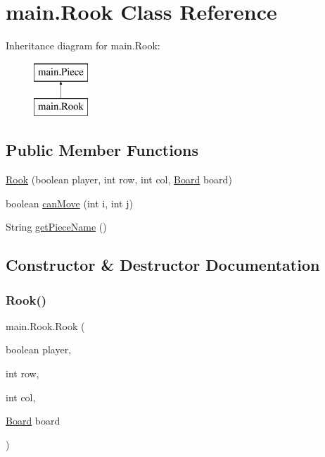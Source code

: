 \hypertarget{classmain_1_1_rook}{}\section{main.\+Rook Class Reference}
\label{classmain_1_1_rook}
Inheritance diagram for main.\+Rook\+:\begin{figure}[H]
\begin{center}
\leavevmode
\includegraphics[height=2.000000cm]{classmain_1_1_rook}
\end{center}
\end{figure}
\subsection*{Public Member Functions}
\begin{DoxyCompactItemize}
\item 
\mbox{\hyperlink{classmain_1_1_rook_af84d3dc19526041f7bb61f3544ab1b4c}{Rook}} (boolean player, int row, int col, \mbox{\hyperlink{classmain_1_1_board}{Board}} board)
\item 
boolean \mbox{\hyperlink{classmain_1_1_rook_a53e4097e83f1ee1d0a093b1dc7efcffa}{can\+Move}} (int i, int j)
\item 
String \mbox{\hyperlink{classmain_1_1_rook_a33eaf3b77f78846b7d165338d6e7bf52}{get\+Piece\+Name}} ()
\end{DoxyCompactItemize}


\subsection{Constructor \& Destructor Documentation}
\mbox{\label{classmain_1_1_rook_af84d3dc19526041f7bb61f3544ab1b4c}} 
\subsubsection{\texorpdfstring{Rook()}{Rook()}}
{\footnotesize\ttfamily main.\+Rook.\+Rook (\begin{DoxyParamCaption}\item[{boolean}]{player,  }\item[{int}]{row,  }\item[{int}]{col,  }\item[{\mbox{\hyperlink{classmain_1_1_board}{Board}}}]{board }\end{DoxyParamCaption})\hspace{0.3cm}{\ttfamily [inline]}}

